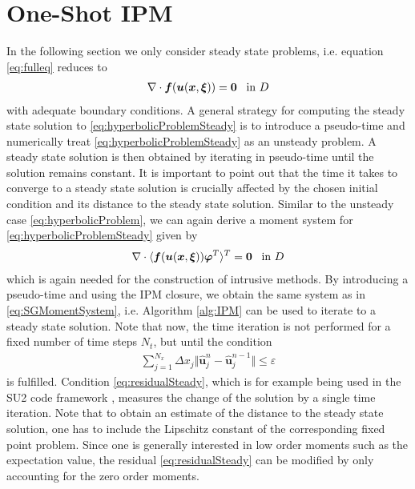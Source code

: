 \section{One-Shot IPM}
\label{sec:OneShotIPM}

In the following section we only consider steady state problems, i.e. equation \eqref{eq:fulleq} reduces to
\begin{align}\label{eq:hyperbolicProblemSteady}
\nabla\cdot\bm{f}(\bm{u}(\bm{x},\bm{\xi})) = \bm{0} \enskip \text{ in } D
\end{align}
with adequate boundary conditions. A general strategy for computing the steady state solution to \eqref{eq:hyperbolicProblemSteady} is to introduce a pseudo-time and numerically treat \eqref{eq:hyperbolicProblemSteady} as an unsteady problem. A steady state solution is then obtained by iterating in pseudo-time until the solution remains constant. It is important to point out that the time it takes to converge to a steady state solution is crucially affected by the chosen initial condition and its distance to the steady state solution.
Similar to the unsteady case \eqref{eq:hyperbolicProblem}, we can again derive a moment system for \eqref{eq:hyperbolicProblemSteady} given by
\begin{align}\label{eq:MomentSystemSteady}
\nabla\cdot\langle\bm{f}(\bm{u}(\bm{x},\bm{\xi}))\bm{\varphi}^T\rangle^T = \bm{0} \enskip \text{ in } D
\end{align}
which is again needed for the construction of intrusive methods. By introducing a pseudo-time and using the IPM closure, we obtain the same system as in \eqref{eq:SGMomentSystem}, i.e. Algorithm \ref{alg:IPM} can be used to iterate to a steady state solution. Note that now, the time iteration is not performed for a fixed number of time steps $N_t$, but until the condition
\begin{align}\label{eq:residualSteady}
\sum_{j = 1}^{N_x} \Delta x_j \Vert \bm{\hat{u}}_j^n - \bm{\hat{u}}_j^{n-1} \Vert \leq \varepsilon
\end{align}
is fulfilled. Condition \eqref{eq:residualSteady}, which is for example being used in the SU2 code framework \cite{economon2015su2}, measures the change of the solution by a single time iteration. Note that to obtain an estimate of the distance to the steady state solution, one has to include the Lipschitz constant of the corresponding fixed point problem. Since one is generally interested in low order moments such as the expectation value, the residual \eqref{eq:residualSteady} can be modified by only accounting for the zero order moments.

